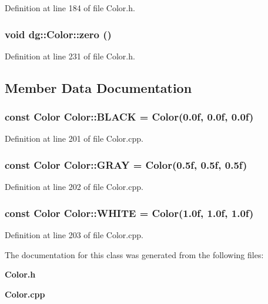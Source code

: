 Definition at line 184 of file Color.h.
\subsubsection{\setlength{\rightskip}{0pt plus 5cm}void dg::Color::zero ()\hspace{0.3cm}{\tt  [inline]}}\label{classdg_1_1Color_a41}




Definition at line 231 of file Color.h.

\subsection{Member Data Documentation}
\subsubsection{\setlength{\rightskip}{0pt plus 5cm}const Color Color::BLACK = Color(0.0f, 0.0f, 0.0f)\hspace{0.3cm}{\tt  [static]}}\label{classdg_1_1Color_p0}




Definition at line 201 of file Color.cpp.
\subsubsection{\setlength{\rightskip}{0pt plus 5cm}const Color Color::GRAY = Color(0.5f, 0.5f, 0.5f)\hspace{0.3cm}{\tt  [static]}}\label{classdg_1_1Color_p1}




Definition at line 202 of file Color.cpp.
\subsubsection{\setlength{\rightskip}{0pt plus 5cm}const Color Color::WHITE = Color(1.0f, 1.0f, 1.0f)\hspace{0.3cm}{\tt  [static]}}\label{classdg_1_1Color_p2}




Definition at line 203 of file Color.cpp.

The documentation for this class was generated from the following files:\begin{CompactItemize}
\item 
{\bf Color.h}\item 
{\bf Color.cpp}\end{CompactItemize}
